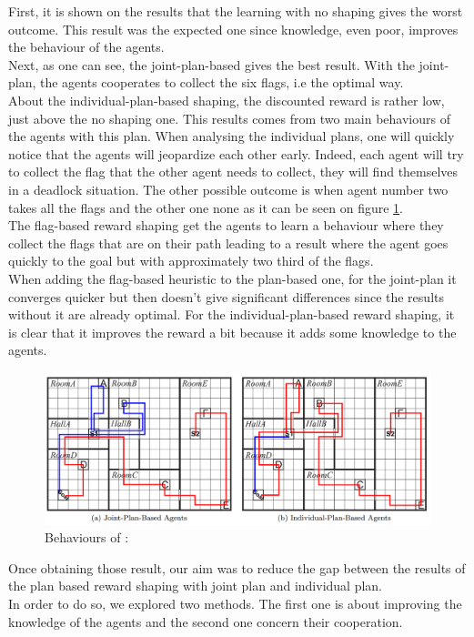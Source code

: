 \documentclass[letterpaper]{article}
\begin{document}
First, it is shown on the results that the learning with no shaping gives the worst outcome. This result was the expected one since knowledge, even poor, improves the behaviour of the agents.\\
Next, as one can see, the joint-plan-based gives the best result. With the joint-plan, the agents cooperates to collect the six flags, i.e the optimal way.\\
About the individual-plan-based shaping, the discounted reward is rather low, just above the no shaping one. This results comes from two main behaviours of the agents with this plan. When analysing the individual plans, one will quickly notice that the agents will jeopardize each other early. Indeed, each agent will try to collect the flag that the other agent needs to collect, they will find themselves in a deadlock situation. The other possible outcome is when agent number two takes all the flags and the other one none as it can be seen on figure \ref{fig:behave}.\\
The flag-based reward shaping get the agents to learn a behaviour where they collect the flags that are on their path leading to a result where the agent goes quickly to the goal but with approximately two third of the flags.\\
When adding the flag-based heuristic to the plan-based one, for the joint-plan it converges quicker but then doesn't give significant differences since the results without it are already optimal. For the individual-plan-based reward shaping, it is clear that it improves the reward a bit because it adds some knowledge to the agents.\\

\begin{figure}[h!]
  \includegraphics[width=\linewidth]{img/behavious.png}
  \caption{Behaviours of :}
  \label{fig:behave}
\end{figure}

Once obtaining those result, our aim was to reduce the gap between the results of the plan based reward shaping with joint plan and individual plan.\\
In order to do so, we explored two methods. The first one is about improving the knowledge of the agents and the second one concern their cooperation.
\end{document}
